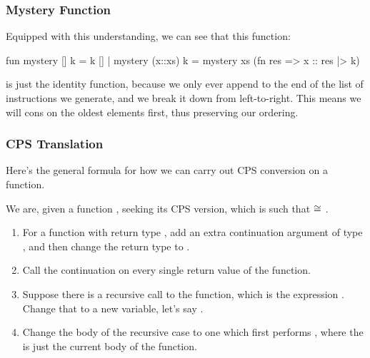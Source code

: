 \documentclass[aspectratio=169]{beamer}
\begin{document}
\begin{frame}[fragile]
  \frametitle{Mystery Function}

  Equipped with this understanding, we can see that this function:
  \begin{codeblock}
    fun mystery [] k      = k []
      | mystery (x::xs) k = mystery xs (fn res => x :: res |> k)
  \end{codeblock}

  \pause
  \vspace{\fill}

  is just the identity function, because we only ever append to the end
  of the list of instructions we generate, and we break it down from
  left-to-right. This means we will cons on the oldest elements first,
  thus preserving our ordering.

  \pause
  \vspace{\fill}


\end{frame}





\begin{frame}[fragile]
  \frametitle{CPS Translation}

  Here's the general formula for how we can carry out CPS conversion on a function.

  \pause
  \vspace{\fill}

  We are, given a function , seeking its CPS version, which is
   such that  $\cong$ .

  \pause
  \vspace{\fill}

  \begin{enumerate}
    \item For a function with return type , add an extra continuation argument
    of type , and then change the return type to . \pause
    \item Call the continuation on every single return value of the function. \pause
    \item Suppose there is a recursive call to the function, which is the expression
    . Change that to a new variable, let's say . \pause
    \item Change the body of the recursive case to one which first performs
    , where the  is just the current
    body of the function.
  \end{enumerate}
\end{frame}
\end{document}

